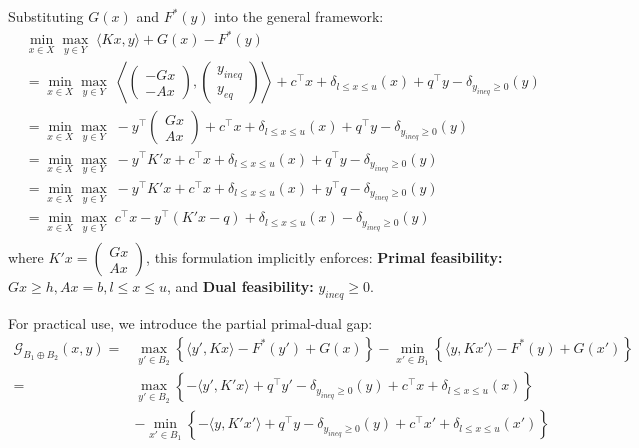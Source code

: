 \documentclass[twoside,12pt,openright]{report}  %
\begin{document}
Substituting \(G(x)\) and \(F^*(y)\) into the general framework:
\[
\begin{aligned}
    &\min_{x \in X} \max_{y \in Y} \; \langle Kx, y \rangle + G(x) - F^*(y)\\
    &= \min_{x \in X} \max_{y \in Y} \; \left\langle \begin{pmatrix}
        -Gx\\
        -Ax
    \end{pmatrix}, \begin{pmatrix}
        y_{ineq}\\
        y_{eq}
    \end{pmatrix} \right\rangle + c^\top x + \delta_{l\le x\le u}(x) +q^\top y - \delta_{y_{ineq} \ge0}(y)\\
    &= \min_{x \in X} \max_{y \in Y} \; -y^\top  \begin{pmatrix}
        Gx\\
        Ax
    \end{pmatrix} + c^\top x + \delta_{l\le x\le u}(x) +q^\top y - \delta_{y_{ineq} \ge0}(y)\\
    &= \min_{x \in X} \max_{y \in Y} \; -y^\top  K'x + c^\top x + \delta_{l\le x\le u}(x) +q^\top y - \delta_{y_{ineq} \ge0}(y)\\
    &= \min_{x \in X} \max_{y \in Y} \; -y^\top  K'x + c^\top x + \delta_{l\le x\le u}(x) +y^\top q - \delta_{y_{ineq} \ge0}(y)\\
    &= \min_{x \in X} \max_{y \in Y} \; c^\top x - y^\top (K'x-q) + \delta_{l\le x\le u}(x)- \delta_{y_{ineq} \ge0}(y)\\
\end{aligned}
\]
where \(K'x=\begin{pmatrix}
    Gx\\
    Ax
\end{pmatrix}\), this formulation implicitly enforces: \textbf{Primal feasibility:} \(Gx \ge h, Ax = b, l\le x \le u\), and \textbf{Dual feasibility:} \(y_{ineq} \ge 0\).

For practical use, we introduce the partial primal-dual gap:
\[
\begin{aligned}
    \mathcal{G}_{B_1 \oplus B_2}(x,y) = &\max_{y' \in B_2}\left\{ \langle y',Kx \rangle - F^*(y')+G(x)\right\} - \min_{x' \in B_1}\left\{ \langle y,Kx' \rangle - F^*(y)+G(x')\right\} \\
    =&\max_{y' \in B_2}\left\{ -\langle y',K'x \rangle +q^\top y' - \delta_{y_{ineq} \ge0}(y
    ) + c^\top x + \delta_{l\le x\le u}(x)\right\} \\
    &- \min_{x' \in B_1}\left\{ -\langle y,K'x' \rangle +q^\top y - \delta_{y_{ineq} \ge0}(y)+ c^\top x' + \delta_{l\le x\le u}(x')\right\} 
\end{aligned}
\]
\end{document}

